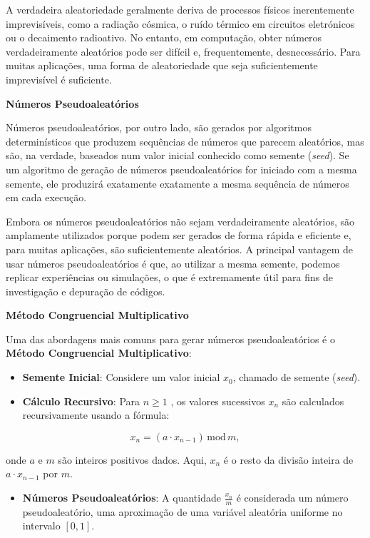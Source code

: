 \documentclass[
]{book}
\providecommand{\tightlist}{%
  \setlength{\itemsep}{0pt}\setlength{\parskip}{0pt}}
\begin{document}
A verdadeira aleatoriedade geralmente deriva de processos físicos
inerentemente imprevisíveis, como a radiação cósmica, o ruído térmico em
circuitos eletrónicos ou o decaimento radioativo. No entanto, em
computação, obter números verdadeiramente aleatórios pode ser difícil e,
frequentemente, desnecessário. Para muitas aplicações, uma forma de
aleatoriedade que seja suficientemente imprevisível é suficiente.

\textbf{Números Pseudoaleatórios}

Números pseudoaleatórios, por outro lado, são gerados por algoritmos
determinísticos que produzem sequências de números que parecem
aleatórios, mas são, na verdade, baseados num valor inicial conhecido
como semente (\emph{seed}). Se um algoritmo de geração de números
pseudoaleatórios for iniciado com a mesma semente, ele produzirá
exatamente exatamente a mesma sequência de números em cada execução.

Embora os números pseudoaleatórios não sejam verdadeiramente aleatórios,
são amplamente utilizados porque podem ser gerados de forma rápida e
eficiente e, para muitas aplicações, são suficientemente aleatórios. A
principal vantagem de usar números pseudoaleatórios é que, ao utilizar a
mesma semente, podemos replicar experiências ou simulações, o que é
extremamente útil para fins de investigação e depuração de códigos.

\textbf{Método Congruencial Multiplicativo}

Uma das abordagens mais comuns para gerar números pseudoaleatórios é o
\textbf{Método Congruencial Multiplicativo}:

\begin{itemize}
\tightlist
\item
  \textbf{Semente Inicial}: Considere um valor inicial \(x_0\), chamado de
  semente (\emph{seed}).
\item
  \textbf{Cálculo Recursivo}: Para \(n \geq 1\) , os valores sucessivos \(x_n\)
  são calculados recursivamente usando a fórmula:
\end{itemize}

\[x_n = (a \cdot x_{n-1}) \, \text{mod} \, m,\]

onde \(a\) e \(m\) são inteiros positivos dados. Aqui, \(x_n\) é o resto da
divisão inteira de \(a \cdot x_{n-1}\) por \(m\).

\begin{itemize}
\tightlist
\item
  \textbf{Números Pseudoaleatórios}: A quantidade \(\frac{x_n}{m}\) é
  considerada um número pseudoaleatório, uma aproximação de uma
  variável aleatória uniforme no intervalo \([0,1]\).
\end{itemize}
\end{document}

